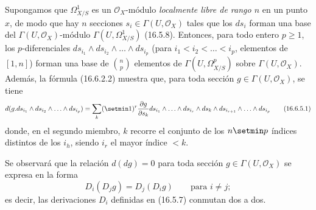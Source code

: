 \begin{env}[16.6.5]
\label{IV.16.6.5}
Supongamos que $\varOmega_{X/S}^1$ es un $\mathcal{O}_X$-módulo \emph{localmente libre
de rango $n$} en un punto $x$, de modo que hay $n$ secciones
$s_i\in\Gamma(U,\mathcal{O}_X)$ tales que los $ds_i$ forman una base del
$\Gamma(U,\mathcal{O}_X)$-módulo $\Gamma(U,\varOmega_{X/S}^1)$ (16.5.8).
Entonces, para todo entero $p\geq1$, los $p$-diferenciales
$ds_{i_1}\wedge ds_{i_2}\wedge\ldots\wedge ds_{i_p}$ (para
$i_1<i_2<\ldots<i_p$, elementos de $[1,n]$) forman una base de
$\binom{n}{p}$ elementos de $\Gamma(U,\varOmega_{X/S}^p)$ sobre
$\Gamma(U,\mathcal{O}_X)$. Además, la fórmula (16.6.2.2) muestra que, para
toda sección $g\in\Gamma(U,\mathcal{O}_X)$, se tiene
\[
  d(g.ds_{i_1}\wedge ds_{i_2}\wedge\ldots\wedge ds_{i_p})
  =\sum_k(\setmin 1)^r\frac{\partial g}{\partial s_k}
  ds_{i_1}\wedge\ldots\wedge ds_{i_r}\wedge ds_k\wedge
  ds_{i_{r+1}}\wedge\ldots\wedge ds_{i_p}
  \tag{16.6.5.1}
  \label{IV.16.6.5.1}
\]
donde, en el segundo miembro, $k$ recorre el conjunto de los $n\setmin p$ índices distintos de los
$i_h$, siendo $i_r$ el mayor índice $<k$.

Se observará que la relación $d(dg)=0$ para toda sección
$g\in\Gamma(U,\mathcal{O}_X)$ se expresa en la forma
\[
  D_i(D_jg)=D_j(D_ig)\qquad\text{para $i\neq j$};
\]
es decir, las derivaciones $D_i$ definidas en (16.5.7) conmutan dos a dos.
\end{env}

